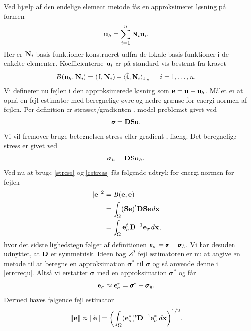 Ved hjælp af den endelige element metode fås en approksimeret løsning
på formen
\begin{equation}
  {\bf u}_h = \sum_{i=1}^n {\bf N}_i {\bf u}_i . 
\end{equation}
Her er ${\bf N}_i$ basis funktioner konstrueret udfra de lokale basis
funktioner i de enkelte elementer. Koefficienterne ${\bf u}_i$ er på
standard vis bestemt fra kravet
\begin{equation}
  B({\bf u}_h,{\bf N}_i) = ({\bf f},{\bf N}_i) + 
  \langle {\bf\hat{t}},{\bf N}_i\rangle_{\Gamma_n}, \quad 
  i=1,\ldots,n.
\end{equation}
Vi definerer nu fejlen i den approksimerede løsning som ${\bf e} =
{\bf u} - {\bf u}_h$. Målet er at opnå en fejl estimator med beregnelige
øvre og nedre grænse for energi normen af fejlen. Per definition er
stresset/gradienten i model problemet givet ved
\begin{equation} \label{stress}
  \pmb{\sigma} = {\bf DSu}.
\end{equation}
Vi vil fremover bruge betegnelsen stress eller gradient i flæng. Det
beregnelige stress er givet ved
\begin{equation} \label{cstress}
  \pmb{\sigma}_h = {\bf DSu}_h .
\end{equation}
Ved nu at bruge \eqref{stress} og \eqref{cstress} fås følgende udtryk
for energi normen for fejlen
\begin{align} \label{errorequ}
  \| {\bf e} \|^2 &= B({\bf e,e}) \\
  &= \int_{\Omega} ({\bf Se})^t {\bf DSe}\, d{\bf x} \notag \\
  &= \int_{\Omega} {\bf e}^t_\sigma {\bf D}^{-1}
     {\bf e}_\sigma\, d{\bf x}, \notag  
\end{align}
hvor det sidste lighedstegn følger af definitionen ${\bf e}_\sigma =
\pmb{\sigma} - \pmb{\sigma}_h$. Vi har desuden udnyttet, at $\bf D$ er
symmetrisk. Ideen bag $Z^2$ fejl estimatoren er nu at angive en
metode til at beregne en approksimation $\pmb{\sigma}^{\ast}$ til
$\pmb{\sigma}$ og så anvende denne i \eqref{errorequ}. Altså vi
erstatter $\pmb{\sigma}$ med en approksimation $\pmb{\sigma}^{\ast}$ og får
\begin{equation}
  {\bf e_\sigma} \approx {\bf e_\sigma^{\ast}} =
  \pmb{\sigma}^{\ast} - \pmb{\sigma}_h .
\end{equation}
Dermed haves følgende fejl estimator
\begin{equation}
  \| {\bf e} \| \approx \|\tilde{\bf e}\| =
  \biggl( \int_{\Omega} ({\bf e}^{\ast}_\sigma)^t {\bf D}^{-1}
     {\bf e}_\sigma^{\ast}\, d{\bf x} \biggr)^{\scriptstyle 1/2}.
\end{equation}

